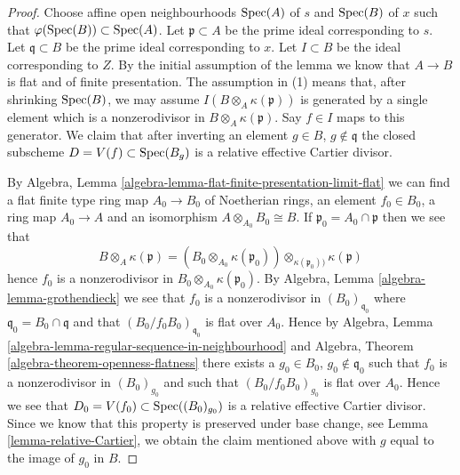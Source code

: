 \begin{proof}
Choose affine open neighbourhoods $\mathop{\mathrm{Spec}}(A)$ of $s$ and
$\mathop{\mathrm{Spec}}(B)$ of $x$ such that
$\varphi(\mathop{\mathrm{Spec}}(B)) \subset \mathop{\mathrm{Spec}}(A)$.
Let $\mathfrak p \subset A$ be the prime ideal corresponding to $s$.
Let $\mathfrak q \subset B$ be the prime ideal corresponding to $x$.
Let $I \subset B$ be the ideal corresponding to $Z$.
By the initial assumption of the lemma we know that
$A \to B$ is flat and of finite presentation.
The assumption in (1) means that, after shrinking $\mathop{\mathrm{Spec}}(B)$, we may
assume $I(B \otimes_A \kappa(\mathfrak p))$ is generated by a single
element which is a nonzerodivisor in $B \otimes_A \kappa(\mathfrak p)$.
Say $f \in I$ maps to this generator. We claim that after inverting
an element $g \in B$, $g \not \in \mathfrak q$ the closed subscheme
$D = V(f) \subset \mathop{\mathrm{Spec}}(B_g)$ is a relative effective Cartier
divisor.

\medskip\noindent
By
Algebra, Lemma \ref{algebra-lemma-flat-finite-presentation-limit-flat}
we can find a flat finite type ring map $A_0 \to B_0$ of Noetherian
rings, an element $f_0 \in B_0$, a ring map $A_0 \to A$ and an isomorphism
$A \otimes_{A_0} B_0 \cong B$. If $\mathfrak p_0 = A_0 \cap \mathfrak p$
then we see that
$$
B \otimes_A \kappa(\mathfrak p) =
\left(B_0 \otimes_{A_0} \kappa(\mathfrak p_0)\right)
\otimes_{\kappa(\mathfrak p_0))} \kappa(\mathfrak p)
$$
hence $f_0$ is a nonzerodivisor in $B_0 \otimes_{A_0} \kappa(\mathfrak p_0)$.
By
Algebra, Lemma \ref{algebra-lemma-grothendieck}
we see that $f_0$ is a nonzerodivisor in $(B_0)_{\mathfrak q_0}$
where $\mathfrak q_0 = B_0 \cap \mathfrak q$ and
that $(B_0/f_0B_0)_{\mathfrak q_0}$ is flat over $A_0$. Hence by
Algebra, Lemma \ref{algebra-lemma-regular-sequence-in-neighbourhood}
and
Algebra, Theorem \ref{algebra-theorem-openness-flatness}
there exists a $g_0 \in B_0$, $g_0 \not \in \mathfrak q_0$ such
that $f_0$ is a nonzerodivisor in $(B_0)_{g_0}$ and such that
$(B_0/f_0B_0)_{g_0}$ is flat over $A_0$. Hence we see that
$D_0 = V(f_0) \subset \mathop{\mathrm{Spec}}((B_0)_{g_0})$ is a relative effective
Cartier divisor. Since we know that this property is preserved under
base change, see
Lemma \ref{lemma-relative-Cartier},
we obtain the claim mentioned above with $g$ equal to the image of $g_0$
in $B$.


\end{proof}
